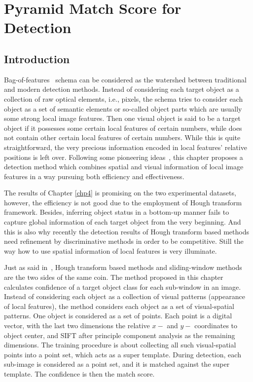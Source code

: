 \chapter{Pyramid Match Score for Detection}
\label{chp5}

\section{Introduction}

Bag-of-features~\citep{bgf} schema can be considered as the watershed between traditional and modern detection methods. Instead of considering each target object as a collection of raw optical elements, i.e., pixels, the schema tries to consider each object as a set of semantic elements or so-called object parts which are usually some strong local image features. Then one visual object is said to be a target object if it possesses some certain local features of certain numbers, while does not contain other certain local features of certain numbers. While this is quite straightforward, the very precious information encoded in local features' relative positions is left over. Following some pioneering ideas~\citep{spmk,ac30}, this chapter proposes a detection method which combines spatial and visual information of local image features in a  way pursuing both efficiency and effectiveness.

The results of Chapter \ref{chp4} is promising on the two experimental datasets, however, the efficiency is not good due to the employment of Hough transform framework.
 Besides, inferring object status in a bottom-up manner fails to capture global information of each target object from the very beginning. And this is also why recently the detection results of Hough transform based methods need refinement by discriminative methods in order to be competitive. Still the way how to use spatial information of local features is very illuminate.

 Just as said in~\citep{ac27}, Hough transform based methods and sliding-window methods are the two sides of the same coin. The method proposed in this chapter calculates confidence of a target object class for each sub-window in an image. Instead of considering each object as a collection of visual patterns (appearance of local features), the method considers each object as a set of visual-spatial patterns. One object is considered as a set of points. Each point is a digital vector, with the last two dimensions the relative $x-$ and $y-$ coordinates to object center, and SIFT after principle component analysis as the remaining dimensions. The training procedure is about collecting all such visual-spatial points into a point set, which acts as a super template. During detection, each sub-image is considered as a point set, and it is matched against the super template. The confidence is then the match score.

